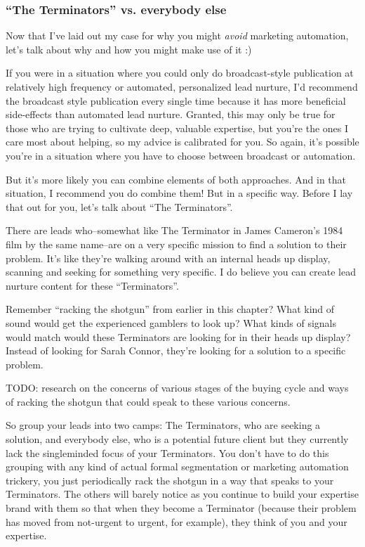 \subsubsection{“The Terminators'' vs. everybody else}

Now that I've laid out my case for why you might \emph{avoid} marketing automation, let's talk about why and how you might make use of it :)

If you were in a situation where you could only do broadcast-style publication at relatively high frequency or automated, personalized lead nurture, I'd recommend the broadcast style publication every single time because it has more beneficial side-effects than automated lead nurture. Granted, this may only be true for those who are trying to cultivate deep, valuable expertise, but you're the ones I care most about helping, so my advice is calibrated for you. So again, it's possible you're in a situation where you have to choose between broadcast or automation.

But it's more likely you can combine elements of both approaches. And in that situation, I recommend you do combine them! But in a specific way. Before I lay that out for you, let's talk about ``The Terminators''.

There are leads who--somewhat like The Terminator in James Cameron's 1984 film by the same name--are on a very specific mission to find a solution to their problem. It's like they're walking around with an internal heads up display, scanning and seeking for something very specific. I do believe you can create lead nurture content for these ``Terminators''.

Remember ``racking the shotgun'' from earlier in this chapter? What kind of sound would get the experienced gamblers to look up? What kinds of signals would match would these Terminators are looking for in their heads up display? Instead of looking for Sarah Connor, they're looking for a solution to a specific problem.

TODO: research on the concerns of various stages of the buying cycle and ways of racking the shotgun that could speak to these various concerns.

So group your leads into two camps: The Terminators, who are seeking a solution, and everybody else, who is a potential future client but they currently lack the singleminded focus of your Terminators. You don't have to do this grouping with any kind of actual formal segmentation or marketing automation trickery, you just periodically rack the shotgun in a way that speaks to your Terminators. The others will barely notice as you continue to build your expertise brand with them so that when they become a Terminator (because their problem has moved from not-urgent to urgent, for example), they think of you and your expertise.

